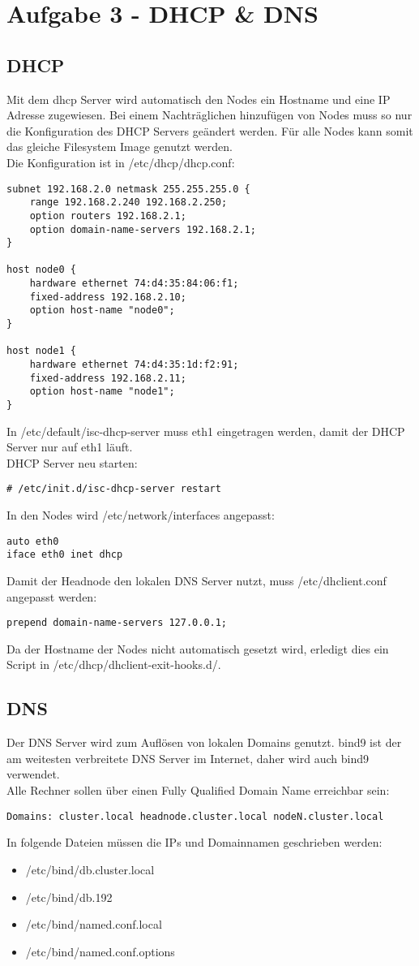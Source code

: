 \chapter{Aufgabe 3 - DHCP \& DNS}
\section{DHCP}
Mit dem dhcp Server wird automatisch den Nodes ein Hostname und eine IP Adresse zugewiesen. Bei einem Nachträglichen hinzufügen von Nodes muss so nur
die Konfiguration des DHCP Servers geändert werden. Für alle Nodes kann somit das gleiche Filesystem Image genutzt werden.\\
Die Konfiguration ist in /etc/dhcp/dhcp.conf:
\begin{lstlisting}[style=Bash]
subnet 192.168.2.0 netmask 255.255.255.0 {
	range 192.168.2.240 192.168.2.250;
	option routers 192.168.2.1;
	option domain-name-servers 192.168.2.1;
}

host node0 {
	hardware ethernet 74:d4:35:84:06:f1;
	fixed-address 192.168.2.10;
	option host-name "node0";
}

host node1 {
	hardware ethernet 74:d4:35:1d:f2:91;
	fixed-address 192.168.2.11;
	option host-name "node1";
}
\end{lstlisting}
In /etc/default/isc-dhcp-server muss eth1 eingetragen werden, damit der DHCP Server nur auf eth1 läuft.\\
DHCP Server neu starten:
\begin{lstlisting}[style=Bash]
# /etc/init.d/isc-dhcp-server restart
\end{lstlisting}
In den Nodes wird /etc/network/interfaces angepasst:
\begin{lstlisting}[style=Bash]
auto eth0
iface eth0 inet dhcp
\end{lstlisting}
Damit der Headnode den lokalen DNS Server nutzt, muss /etc/dhclient.conf angepasst werden:
\begin{lstlisting}[style=Bash]
prepend domain-name-servers 127.0.0.1;
\end{lstlisting}
Da der Hostname der Nodes nicht automatisch gesetzt wird, erledigt dies ein Script in /etc/dhcp/dhclient-exit-hooks.d/.
\section{DNS}
Der DNS Server wird zum Auflösen von lokalen Domains genutzt. bind9 ist der am weitesten verbreitete DNS Server im Internet, daher wird auch bind9 verwendet.\\
Alle Rechner sollen über einen Fully Qualified Domain Name erreichbar sein:
\begin{lstlisting}[style=Bash]
Domains: cluster.local headnode.cluster.local nodeN.cluster.local
\end{lstlisting}
In folgende Dateien müssen die IPs und Domainnamen geschrieben werden:
\begin {itemize}
\item /etc/bind/db.cluster.local
\item /etc/bind/db.192
\item /etc/bind/named.conf.local
\item /etc/bind/named.conf.options
\end{itemize}
